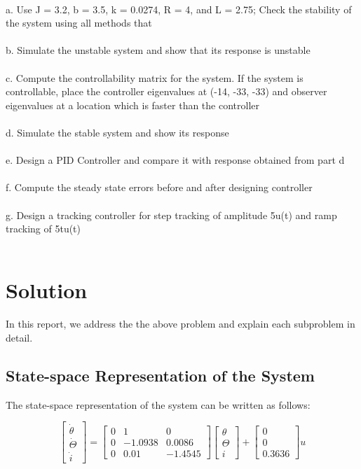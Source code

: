 \documentclass{article}
\begin{document}
\\
\noindent a. Use J = 3.2, b = 3.5, k = 0.0274, R = 4, and L = 2.75; Check the stability of the system using all methods that \\
\\
b. Simulate the unstable system and show that its response is unstable \\\\
c. Compute the controllability matrix for the system. If the system is controllable, place the controller eigenvalues at (-14, -33, -33) and observer eigenvalues at a location which is faster than the controller \\\\
d. Simulate the stable system and show its response \\\\
e. Design a PID Controller and compare it with response obtained from part d\\ \\
f. Compute the steady state errors before and after designing controller\\ \\
g. Design a tracking controller for step tracking of amplitude 5u(t) and ramp tracking of 5tu(t)\\ \\
\vskip30pt

\section{Solution}
In this report, we address the the above problem and explain each subproblem in detail.


\subsection{State-space Representation of the System}
The state-space representation of the system can be written as follows:

\begin{equation}
\begin{bmatrix} \dot{\theta}\\  \dot{\Theta} \\ \dot{i}\end{bmatrix}
= \begin{bmatrix}
0 & 1 & 0 \\
0 & -1.0938 & 0.0086 \\
0 & 0.01 & -1.4545  \end{bmatrix}
\begin{bmatrix} \theta\\  \Theta \\ i \end{bmatrix} +
\begin{bmatrix}
0 \\
0 \\
0.3636  \end{bmatrix}
 u 
\end{equation}
\end{document}
